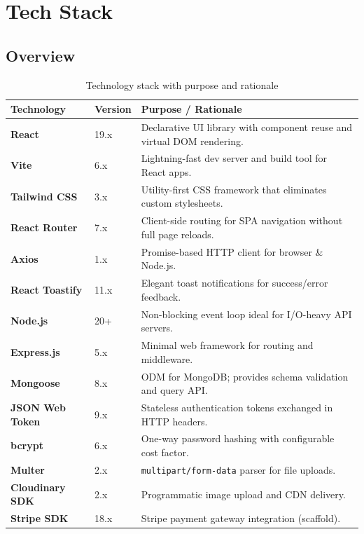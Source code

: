 \documentclass[12pt,a4paper]{report}
\begin{document}
\chapter{Tech Stack}

\section{Overview}

\begin{table}[H]
  \centering
  \caption{Technology stack with purpose and rationale}
  \label{tab:stack}
  \begin{tabular}{>{\bfseries}p{3.2cm} p{3cm} p{7cm}}
    \toprule
    Technology & Version & Purpose / Rationale \\
    \midrule
    React & 19.x & Declarative UI library with component reuse and virtual DOM rendering. \\
    Vite & 6.x & Lightning-fast dev server and build tool for React apps. \\
    Tailwind CSS & 3.x & Utility-first CSS framework that eliminates custom stylesheets. \\
    React Router & 7.x & Client-side routing for SPA navigation without full page reloads. \\
    Axios & 1.x & Promise-based HTTP client for browser \& Node.js. \\
    React Toastify & 11.x & Elegant toast notifications for success/error feedback. \\
    \midrule
    Node.js & 20+ & Non-blocking event loop ideal for I/O-heavy API servers. \\
    Express.js & 5.x & Minimal web framework for routing and middleware. \\
    Mongoose & 8.x & ODM for MongoDB; provides schema validation and query API. \\
    JSON Web Token & 9.x & Stateless authentication tokens exchanged in HTTP headers. \\
    bcrypt & 6.x & One-way password hashing with configurable cost factor. \\
    Multer & 2.x & \texttt{multipart/form-data} parser for file uploads. \\
    Cloudinary SDK & 2.x & Programmatic image upload and CDN delivery. \\
    Stripe SDK & 18.x & Stripe payment gateway integration (scaffold). \\

\end{tabular}
\end{table}
\end{document}
